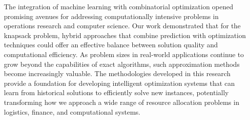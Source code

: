 \documentclass[conference, a4paper]{IEEEtran}
\begin{document}
The integration of machine learning with combinatorial optimization opened promising avenues for addressing computationally intensive problems in operations research and computer science. Our work demonstrated that for the knapsack problem, hybrid approaches that combine prediction with optimization techniques could offer an effective balance between solution quality and computational efficiency. As problem sizes in real-world applications continue to grow beyond the capabilities of exact algorithms, such approximation methods become increasingly valuable. The methodologies developed in this research provide a foundation for developing intelligent optimization systems that can learn from historical solutions to efficiently solve new instances, potentially transforming how we approach a wide range of resource allocation problems in logistics, finance, and computational systems.
\end{document}
